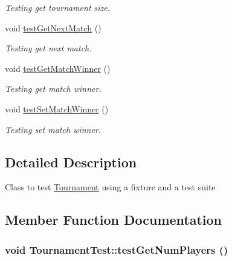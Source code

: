 \begin{DoxyCompactItemize}
\begin{DoxyCompactList}\small\item\em Testing get tournament size. \item\end{DoxyCompactList}\item 
\hypertarget{classTournamentTest_a4b7aa4226a87061e56c932b3a4f6790f}{
void \hyperlink{classTournamentTest_a4b7aa4226a87061e56c932b3a4f6790f}{testGetNextMatch} ()}
\label{classTournamentTest_a4b7aa4226a87061e56c932b3a4f6790f}

\begin{DoxyCompactList}\small\item\em Testing get next match. \item\end{DoxyCompactList}\item 
\hypertarget{classTournamentTest_a0699a0def80419248e8b5feba33460d5}{
void \hyperlink{classTournamentTest_a0699a0def80419248e8b5feba33460d5}{testGetMatchWinner} ()}
\label{classTournamentTest_a0699a0def80419248e8b5feba33460d5}

\begin{DoxyCompactList}\small\item\em Testing get match winner. \item\end{DoxyCompactList}\item 
\hypertarget{classTournamentTest_a1ac8de43f0355ae6165c2bb00e45ae1b}{
void \hyperlink{classTournamentTest_a1ac8de43f0355ae6165c2bb00e45ae1b}{testSetMatchWinner} ()}
\label{classTournamentTest_a1ac8de43f0355ae6165c2bb00e45ae1b}

\begin{DoxyCompactList}\small\item\em Testing set match winner. \item\end{DoxyCompactList}\end{DoxyCompactItemize}


\subsection{Detailed Description}
Class to test \hyperlink{classTournament}{Tournament} using a fixture and a test suite 

\subsection{Member Function Documentation}
\hypertarget{classTournamentTest_acabeb35b05c90cb7e622e75704820422}{
\subsubsection[{testGetNumPlayers}]{\setlength{\rightskip}{0pt plus 5cm}void TournamentTest::testGetNumPlayers ()}}
\label{classTournamentTest_acabeb35b05c90cb7e622e75704820422}


